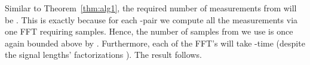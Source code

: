 \documentclass{article}
\begin{document}
Similar to Theorem~\ref{thm:alg1}, the required number of measurements from  will be .  This is exactly because for each -pair we compute all the measurements 
via one FFT requiring  samples.  Hence, the number of samples from  we use is once again bounded above by .  Furthermore, each of the  FFT's will take -time (despite the signal lengths' factorizations \cite{1968-bluestein,rabiner-schafer-rader}).  The result follows.
~~ \\
\end{document}
